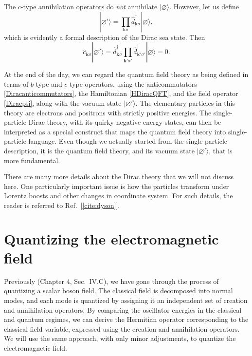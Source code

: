 \documentclass[pra,12pt]{revtex4}
\begin{document}
The $c$-type annihilation operators do \textit{not} annihilate
$|\varnothing\rangle$.  However, let us define
\begin{equation}
  |\varnothing'\rangle = \prod_{\mathbf{k}\sigma} \hat{d}_{\mathbf{k}\sigma}^\dagger
  |\varnothing\rangle,
\end{equation}
which is evidently a formal description of the Dirac sea state.  Then
\begin{equation}
  \hat{c}_{\mathbf{k}\sigma} |\varnothing'\rangle = 
  \hat{d}^\dagger_{\mathbf{k}\sigma} \prod_{\mathbf{k}'\sigma'}
  \hat{d}_{\mathbf{k}'\sigma'}^\dagger |\varnothing\rangle = 0.
\end{equation}

At the end of the day, we can regard the quantum field theory as being
defined in terms of $b$-type and $c$-type operators, using the
anticommutators \eqref{Diracanticommutators}, the Hamiltonian
\eqref{HDiracQFT}, and the field operator \eqref{Diracpsi}, along with
the vacuum state $|\varnothing'\rangle$.  The elementary particles in
this theory are electrons and positrons with strictly positive
energies.  The single-particle Dirac theory, with its quirky
negative-energy states, can then be interpreted as a special construct
that maps the quantum field theory into single-particle language.
Even though we actually started from the single-particle description,
it is the quantum field theory, and its vacuum state
$|\varnothing'\rangle$, that is more fundamental.

There are many more details about the Dirac theory that we will not
discuss here.  One particularly important issue is how the particles
transform under Lorentz boosts and other changes in coordinate system.
For such details, the reader is referred to Ref.~[\ref{cite:dyson}].

\section{Quantizing the electromagnetic field}
\label{sec:em_quantization}

Previously (Chapter 4, Sec.~IV.C), we have gone through the process of
quantizing a scalar boson field.  The classical field is decomposed
into normal modes, and each mode is quantized by assigning it an
independent set of creation and annihilation operators.  By comparing
the oscillator energies in the classical and quantum regimes, we can
derive the Hermitian operator corresponding to the classical field
variable, expressed using the creation and annihilation operators.  We
will use the same approach, with only minor adjustments, to quantize
the electromagnetic field.
\end{document}
